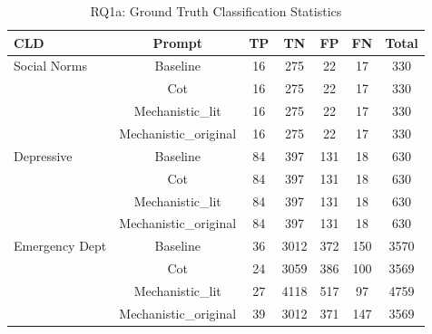 \begin{table}[htbp]
\centering
\caption{RQ1a: Ground Truth Classification Statistics}
\label{tab:rq1a_gt_classification}
\begin{tabular}{lcccccc}
\toprule
\textbf{CLD} & \textbf{Prompt} & \textbf{TP} & \textbf{TN} & \textbf{FP} & \textbf{FN} & \textbf{Total} \\
\midrule
Social Norms & Baseline & 16 & 275 & 22 & 17 & 330 \\
 & Cot & 16 & 275 & 22 & 17 & 330 \\
 & Mechanistic_lit & 16 & 275 & 22 & 17 & 330 \\
 & Mechanistic_original & 16 & 275 & 22 & 17 & 330 \\
\midrule
Depressive & Baseline & 84 & 397 & 131 & 18 & 630 \\
 & Cot & 84 & 397 & 131 & 18 & 630 \\
 & Mechanistic_lit & 84 & 397 & 131 & 18 & 630 \\
 & Mechanistic_original & 84 & 397 & 131 & 18 & 630 \\
\midrule
Emergency Dept & Baseline & 36 & 3012 & 372 & 150 & 3570 \\
 & Cot & 24 & 3059 & 386 & 100 & 3569 \\
 & Mechanistic_lit & 27 & 4118 & 517 & 97 & 4759 \\
 & Mechanistic_original & 39 & 3012 & 371 & 147 & 3569 \\
\midrule
\bottomrule
\end{tabular}
\end{table}